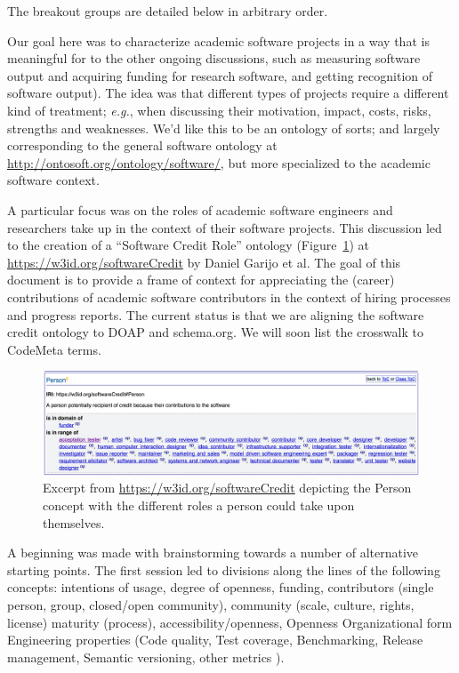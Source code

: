 \documentclass[a4paper,UKenglish]{dagrep}
\newcommand{\eg}{\emph{e.g.},\xspace}
\begin{document}
The breakout groups are detailed below in arbitrary order.


Our goal here was to characterize academic software projects in a way that is meaningful for to the other ongoing discussions, such as measuring software output and acquiring funding for research software, and getting recognition of software output). The idea was that different types of projects require a different kind of treatment; \eg when discussing their motivation, impact, costs, risks, strengths and weaknesses. We'd like this to be an ontology of sorts; and largely corresponding to the general software ontology at \url{http://ontosoft.org/ontology/software/}, but more specialized to the academic software context.

A particular focus was on the roles of academic software engineers and researchers take up in the context of their software projects. This discussion led to the creation of a ``Software Credit Role'' ontology (Figure~\ref{fig:credits}) at \url{https://w3id.org/softwareCredit} by Daniel Garijo et al. The goal of this document is to provide a frame of context for appreciating the (career) contributions of academic software contributors in the context of hiring processes and progress reports. The current status is that we are aligning the software credit ontology to DOAP and schema.org. We will soon list the crosswalk to CodeMeta terms.

\begin{figure}[t]
\includegraphics[width=\textwidth]{credits}
\caption{Excerpt from \url{https://w3id.org/softwareCredit} depicting the Person concept with the different roles a person could take upon themselves.\label{fig:credits}}
\end{figure}

A beginning was made with brainstorming towards a number of alternative starting points. The first session led to divisions along the lines of the following concepts: intentions of usage,
degree of openness,
funding,
contributors (single person, group, closed/open community),
community (scale, culture, rights, license)
maturity (process),
accessibility/openness,
Openness
Organizational form
Engineering properties
(Code quality,
Test coverage,
Benchmarking,
Release management,
Semantic versioning,
other metrics
).
\end{document}
